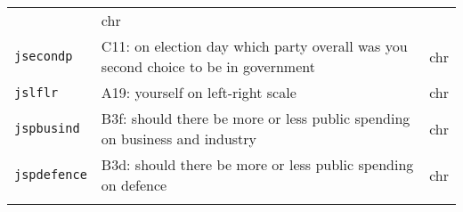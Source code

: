 \documentclass[]{article}
\begin{document}
\begin{longtable}[]{@{}lll@{}}
\begin{minipage}[t]{0.70\columnwidth}
\end{minipage} & \begin{minipage}[t]{0.08\columnwidth}\raggedright\strut
chr\strut
\end{minipage}\tabularnewline
\begin{minipage}[t]{0.14\columnwidth}\raggedright\strut
\texttt{jsecondp}\strut
\end{minipage} & \begin{minipage}[t]{0.70\columnwidth}\raggedright\strut
C11: on election day which party overall was you second choice to be in
government\strut
\end{minipage} & \begin{minipage}[t]{0.08\columnwidth}\raggedright\strut
chr\strut
\end{minipage}\tabularnewline
\begin{minipage}[t]{0.14\columnwidth}\raggedright\strut
\texttt{jslflr}\strut
\end{minipage} & \begin{minipage}[t]{0.70\columnwidth}\raggedright\strut
A19: yourself on left-right scale\strut
\end{minipage} & \begin{minipage}[t]{0.08\columnwidth}\raggedright\strut
chr\strut
\end{minipage}\tabularnewline
\begin{minipage}[t]{0.14\columnwidth}\raggedright\strut
\texttt{jspbusind}\strut
\end{minipage} & \begin{minipage}[t]{0.70\columnwidth}\raggedright\strut
B3f: should there be more or less public spending on business and
industry\strut
\end{minipage} & \begin{minipage}[t]{0.08\columnwidth}\raggedright\strut
chr\strut
\end{minipage}\tabularnewline
\begin{minipage}[t]{0.14\columnwidth}\raggedright\strut
\texttt{jspdefence}\strut
\end{minipage} & \begin{minipage}[t]{0.70\columnwidth}\raggedright\strut
B3d: should there be more or less public spending on defence\strut
\end{minipage} & \begin{minipage}[t]{0.08\columnwidth}\raggedright\strut
chr\strut
\end{minipage}\tabularnewline
\begin{minipage}[t]{0.14\columnwidth}\raggedright\strut

\end{minipage}
\end{longtable}
\end{document}
